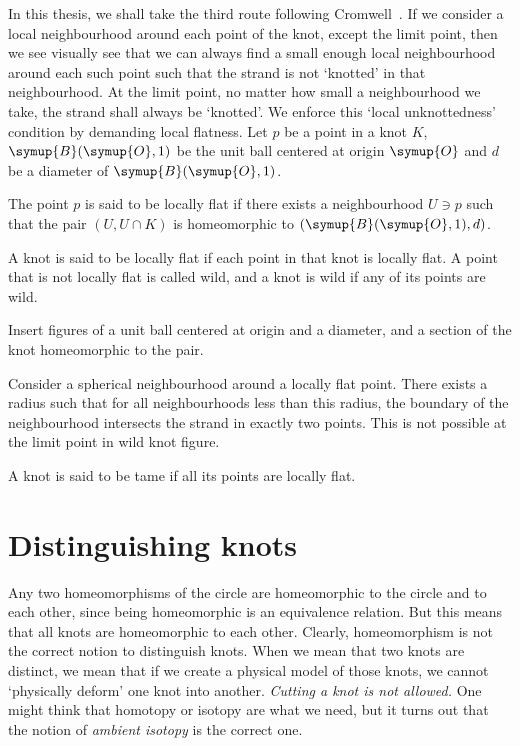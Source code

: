 In this thesis, we shall take the third route following Cromwell~\cite[chp.~1]{cromwell}. If we consider a local neighbourhood around each point of the knot, except the limit point, then we see visually see that we can always find a small enough local neighbourhood around each such point such that the strand is not `knotted' in that neighbourhood. At the limit point, no matter how small a neighbourhood we take, the strand shall always be `knotted'. We enforce this `local unknottedness' condition by demanding local flatness. Let \(p\) be a point in a knot \(K\), \(\symup{B}(\symup{O}, 1)\) be the unit ball centered at origin \(\symup{O}\) and \(d\) be a diameter of \(\symup{B}(\symup{O}, 1)\).
\begin{defn}
    The point \(p\) is said to be locally flat if there exists a neighbourhood \(U \ni p\) such that the pair \((U, U \cap K)\) is homeomorphic to \((\symup{B}(\symup{O}, 1), d)\).

    A knot is said to be locally flat if each point in that knot is locally flat. A point that is not locally flat is called wild, and a knot is wild if any of its points are wild.
\end{defn}
Insert figures of a unit ball centered at origin and a diameter, and a section of the knot homeomorphic to the pair.

Consider a spherical neighbourhood around a locally flat point. There exists a radius such that for all neighbourhoods less than this radius, the boundary of the neighbourhood intersects the strand in exactly two points. This is not possible at the limit point in wild knot figure.

\begin{defn}
    A knot is said to be tame if all its points are locally flat.
\end{defn}

\section{Distinguishing knots}

Any two homeomorphisms of the circle are homeomorphic to the circle and to each other, since being homeomorphic is an equivalence relation. But this means that all knots are homeomorphic to each other. Clearly, homeomorphism is not the correct notion to distinguish knots. When we mean that two knots are distinct, we mean that if we create a physical model of those knots, we cannot `physically deform' one knot into another. \textit{Cutting a knot is not allowed.} One might think that homotopy or isotopy are what we need, but it turns out that the notion of \textit{ambient isotopy} is the correct one.

